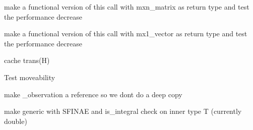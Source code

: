 
\begin{DoxyRefList}
\item[\label{todo__todo000002}%
\Hypertarget{todo__todo000002}%
Member \hyperlink{classkafi_1_1jacobian__function_a769dbc859c0bbc91f2104e31a81b86aa}{kafi\+:\+:jacobian\+\_\+function$<$ N, M $>$\+:\+:jacobian} (const nx1\+\_\+vector \&state, mxn\+\_\+matrix \&jacobi\+\_\+temp) const]make a functional version of this call with {\ttfamily mxn\+\_\+matrix} as return type and test the performance decrease  
\item[\label{todo__todo000001}%
\Hypertarget{todo__todo000001}%
Member \hyperlink{classkafi_1_1jacobian__function_a10675231d99de2d565af965efa4010e8}{kafi\+:\+:jacobian\+\_\+function$<$ N, M $>$\+:\+:operator()} (nx1\+\_\+vector \&state, mx1\+\_\+vector \&output) const]make a functional version of this call with {\ttfamily mx1\+\_\+vector} as return type and test the performance decrease  
\item[\label{todo__todo000005}%
\Hypertarget{todo__todo000005}%
Member \hyperlink{classkafi_1_1kafi_a4e90a69f858c0c49f7fde168561da254}{kafi\+:\+:kafi$<$ N, M $>$\+:\+:apply\+\_\+update} ()]cache {\ttfamily trans(\+H)}  
\item[\label{todo__todo000003}%
\Hypertarget{todo__todo000003}%
Member \hyperlink{classkafi_1_1kafi_ac2331ba8c5ad075cbdb6580eb41bf9eb}{kafi\+:\+:kafi$<$ N, M $>$\+:\+:kafi} (const self\+\_\+t \&\&other)=delete]Test moveability  
\item[\label{todo__todo000004}%
\Hypertarget{todo__todo000004}%
Member \hyperlink{classkafi_1_1kafi_a8bb1520922ac9bab7479c89a9681b956}{kafi\+:\+:kafi$<$ N, M $>$\+:\+:set\+\_\+current\+\_\+observation} (mx1\+\_\+vector \&observation)]make {\ttfamily \+\_\+observation} a reference so we don\textquotesingle{}t do a deep copy  
\item[\label{todo__todo000006}%
\Hypertarget{todo__todo000006}%
Member \hyperlink{namespacekafi_1_1util_adebb31ac70499385be7e7693e9c73453}{kafi\+:\+:util\+:\+:create\+\_\+identity} ()]make generic with S\+F\+I\+N\+AE and {\ttfamily is\+\_\+integral} check on inner type {\ttfamily T} (currently {\ttfamily double}) 
\end{DoxyRefList}